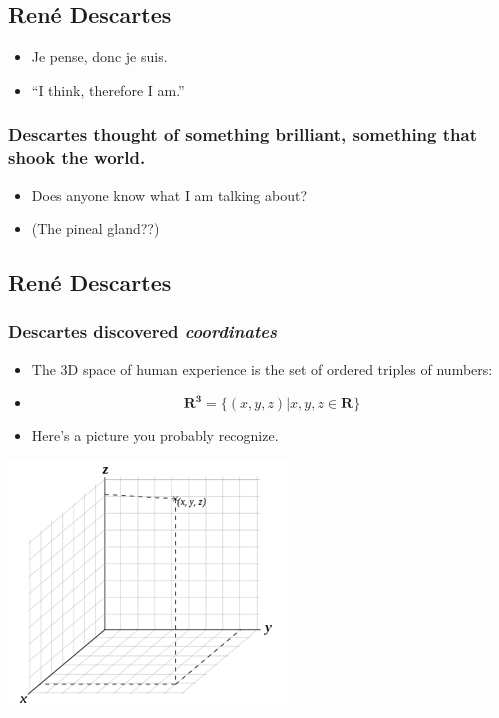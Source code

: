 \documentclass[]{article}
\begin{document}
\subsection{René Descartes}\label{renuxe9-descartes}

\begin{itemize}
\itemsep1pt\parskip0pt
\item
  Je pense, donc je suis.
\item
  ``I think, therefore I am.''
\end{itemize}

\subsubsection{Descartes thought of something brilliant, something that
shook the
world.}\label{descartes-thought-of-something-brilliant-something-that-shook-the-world.}

\begin{itemize}
\itemsep1pt\parskip0pt
\item
  Does anyone know what I am talking about?
\item
  (The pineal gland??)
\end{itemize}

\subsection{René Descartes}\label{renuxe9-descartes-1}

\subsubsection{Descartes discovered
\emph{coordinates}}\label{descartes-discovered-coordinates}

\begin{itemize}
\itemsep1pt\parskip0pt
\item
  The 3D space of human experience is the set of ordered triples of
  numbers:
\item
  \[\mathbf{R^3}=\{(x,y,z) | x,y,z\in\mathbf{R}\}\]
\item
  Here's a picture you probably recognize.
\end{itemize}

\includegraphics{cartesian.png}
\end{document}
